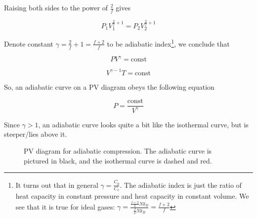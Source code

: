 Raising both sides to the power of $\frac{2}{f}$ gives

\[P_1 V_1^{\frac{2}{f}+1}=P_2 V_2^{\frac{2}{f}+1}\]

Denote constant $\gamma=\frac{2}{f}+1=\frac{f+2}{f}$ to be adiabatic index\footnote{It turns out that in general $\gamma=\frac{C_p}{C_v}$. The adiabatic index is just the ratio of heat capacity in constant pressure and heat capacity in constant volume. We see that it is true for ideal gases: $\gamma=\frac{\frac{f+2}{2}Nk_B}{\frac{f}{2}Nk_B}=\frac{f+2}{f}$}, we conclude that

\[PV^\gamma=\text{const}\]

\[V^{\gamma-1}T=\text{const}\]

So, an adiabatic curve on a PV diagram obeys the following equation

\[P=\frac{\text{const}}{V^\gamma}\]

Since $\gamma>1$, an adiabatic curve looks quite a bit like the isothermal curve, but is steeper/lies above it.

\begin{figure}[H]
	\centering
	\caption{PV diagram for adiabatic compression. The adiabatic curve is pictured in black, and the isothermal curve is dashed and red.}
\end{figure}

